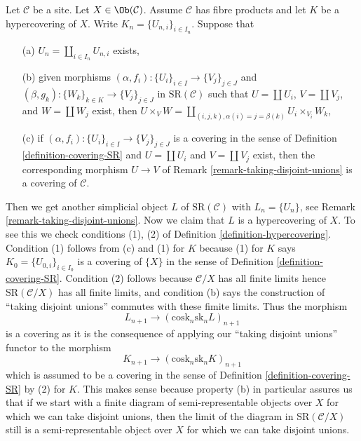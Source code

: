 \begin{remark}
\label{remark-take-unions-hypercovering-X}
Let $\mathcal{C}$ be a site. Let $X \in \Ob(\mathcal{C})$.
Assume $\mathcal{C}$ has fibre products and let $K$ be a hypercovering of $X$.
Write $K_n = \{U_{n, i}\}_{i \in I_n}$. Suppose that
\begin{enumerate}
\item[(a)] $U_n = \coprod_{i \in I_n} U_{n, i}$ exists,
\item[(b)] given morphisms
$(\alpha, f_i) : \{U_i\}_{i \in I} \to \{V_j\}_{j \in J}$ and
$(\beta, g_k) : \{W_k\}_{k \in K} \to \{V_j\}_{j \in J}$
in $\text{SR}(\mathcal{C})$ such that
$U = \coprod U_i$, $V = \coprod V_j$, and $W = \coprod W_j$
exist, then $U \times_V W =
\coprod_{(i, j, k), \alpha(i) = j = \beta(k)} U_i \times_{V_i} W_k$,
\item[(c)] if $(\alpha, f_i) : \{U_i\}_{i \in I} \to \{V_j\}_{j \in J}$
is a covering in the sense of
Definition \ref{definition-covering-SR}
and $U = \coprod U_i$ and $V = \coprod V_j$ exist,
then the corresponding morphism $U \to V$
of Remark \ref{remark-taking-disjoint-unions}
is a covering of $\mathcal{C}$.
\end{enumerate}
Then we get another simplicial object $L$ of $\text{SR}(\mathcal{C})$
with $L_n = \{U_n\}$, see
Remark \ref{remark-taking-disjoint-unions}.
Now we claim that $L$ is a hypercovering of $X$.
To see this we check conditions (1), (2) of
Definition \ref{definition-hypercovering}.
Condition (1) follows from (c) and (1) for $K$
because (1) for $K$ says $K_0 = \{U_{0, i}\}_{i \in I_0}$
is a covering of $\{X\}$ in the sense of
Definition \ref{definition-covering-SR}.
Condition (2) follows because $\mathcal{C}/X$ has
all finite limits hence $\text{SR}(\mathcal{C}/X)$
has all finite limits, and condition (b) says the
construction of ``taking disjoint unions'' commutes
with these fimite limits. Thus the morphism
$$
L_{n + 1} \longrightarrow (\text{cosk}_n \text{sk}_n L)_{n + 1}
$$
is a covering as it is the consequence of applying our
``taking disjoint unions'' functor to the morphism
$$
K_{n + 1} \longrightarrow (\text{cosk}_n \text{sk}_n K)_{n + 1}
$$
which is assumed to be a covering in the sense of
Definition \ref{definition-covering-SR} by (2) for $K$.
This makes sense because property (b) in particular assures
us that if we start with a finite diagram of
semi-representable objects over $X$
for which we can take disjoint unions, then
the limit of the diagram in $\text{SR}(\mathcal{C}/X)$
still is a semi-representable object over $X$ for which
we can take disjoint unions.
\end{remark}











